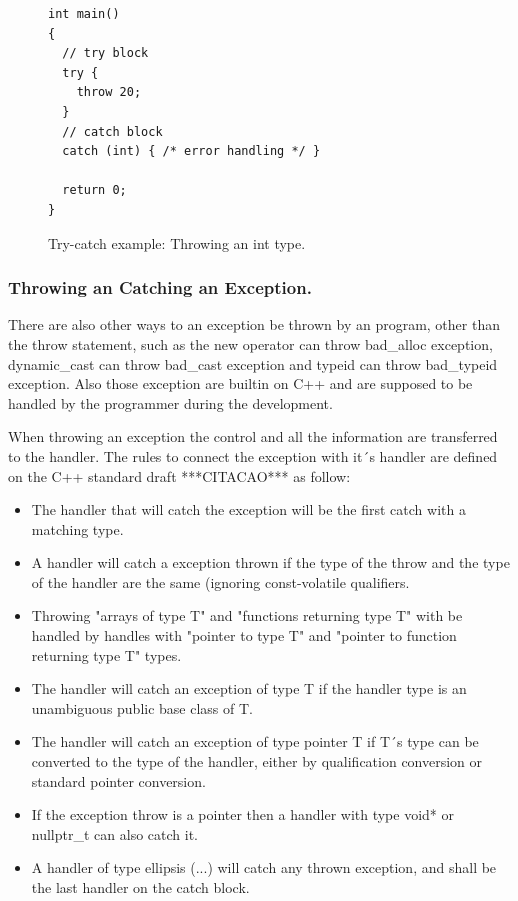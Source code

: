 \documentclass[a4paper]{llncs}
\begin{document}
\begin{figure}[ht]
\centering
\begin{minipage}{0.7\textwidth}
\begin{lstlisting}
int main() 
{
  // try block
  try {
    throw 20;
  }
  // catch block
  catch (int) { /* error handling */ }

  return 0;
}
\end{lstlisting}
\end{minipage}
\caption{Try-catch example: Throwing an int type.}
\label{figure:try-catch-example}
\end{figure}

\subsubsection{Throwing an Catching an Exception.}

There are also other ways to an exception be thrown by an program, other than the throw statement, such as the new operator can throw 
bad\_alloc exception, dynamic\_cast can throw bad\_cast exception and typeid can throw bad\_typeid exception. Also those exception are 
builtin on C++ and are supposed to be handled by the programmer during the development.

When throwing an exception the control and all the information are transferred to the handler. The rules to connect the exception with it´s
handler are defined on the C++ standard draft ***CITACAO*** as follow:

\begin{itemize}
 \item The handler that will catch the exception will be the first catch with a matching type.
 \item A handler will catch a exception thrown if the type of the throw and the type of the handler are the same (ignoring const-volatile
       qualifiers.
 \item Throwing "arrays of type T" and "functions returning type T" with be handled by handles with "pointer to type T" 
       and "pointer to function returning type T" types.
 \item The handler will catch an exception of type T if the handler type is an unambiguous public base class of T.
 \item The handler will catch an exception of type pointer T if T´s type can be converted to the type of the handler, either by 
       qualification conversion or standard pointer conversion.
 \item If the exception throw is a pointer then a handler with type void* or nullptr\_t can also catch it.
 \item A handler of type ellipsis (...) will catch any thrown exception, and shall be the last handler on the catch block.
\end{itemize}
\end{document}
